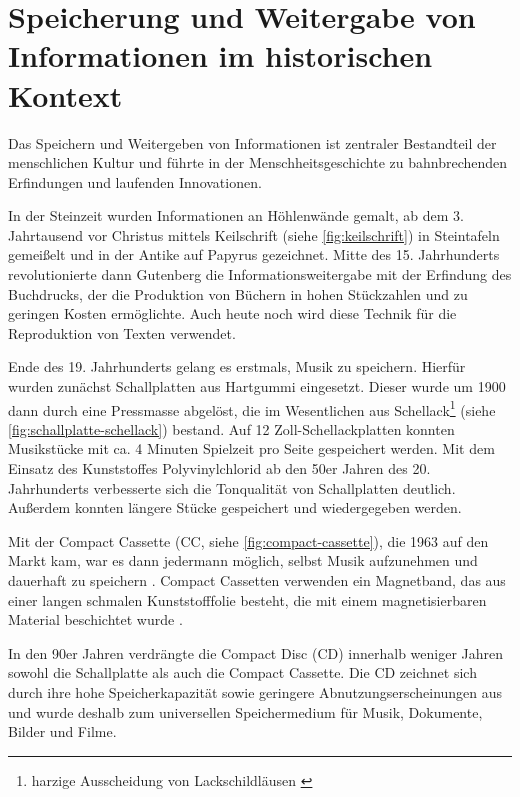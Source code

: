 \section{Speicherung und Weitergabe von Informationen im historischen Kontext}
\label{sec:einleitung}

Das Speichern und Weitergeben von Informationen ist zentraler Bestandteil der
menschlichen Kultur und führte in der Menschheitsgeschichte zu bahnbrechenden
Erfindungen und laufenden Innovationen.

In der Steinzeit wurden Informationen an Höhlenwände gemalt, ab dem 3.
Jahrtausend vor Christus mittels Keilschrift (siehe \autoref{fig:keilschrift})
in Steintafeln gemeißelt und in der Antike auf Papyrus gezeichnet. Mitte des 15.
Jahrhunderts revolutionierte dann Gutenberg die Informationsweitergabe mit der
Erfindung des Buchdrucks, der die Produktion von Büchern in hohen Stückzahlen
und zu geringen Kosten ermöglichte. Auch heute noch wird diese Technik für die
Reproduktion von Texten verwendet.

Ende des 19. Jahrhunderts gelang es erstmals, Musik zu speichern. Hierfür wurden
zunächst Schallplatten aus Hartgummi eingesetzt. Dieser wurde um 1900 dann durch
eine Pressmasse abgelöst, die im Wesentlichen aus Schellack\footnote{harzige
Ausscheidung von Lackschildläusen \cite{schellack}} (siehe
\autoref{fig:schallplatte-schellack}) bestand. Auf 12 Zoll-Schellackplatten
konnten Musikstücke mit ca. 4 Minuten Spielzeit pro Seite gespeichert werden.
Mit dem Einsatz des Kunststoffes Polyvinylchlorid ab den 50er Jahren des 20.
Jahrhunderts verbesserte sich die Tonqualität von Schallplatten deutlich.
Außerdem konnten längere Stücke gespeichert und wiedergegeben werden.
\cite{schallplatte1}

Mit der Compact Cassette (CC, siehe \autoref{fig:compact-cassette}), die 1963
auf den Markt kam, war es dann jedermann möglich, selbst Musik aufzunehmen und
dauerhaft zu speichern \cite{kassette1}. Compact Cassetten verwenden ein
Magnetband, das aus einer langen schmalen Kunststofffolie besteht, die mit einem
magnetisierbaren Material beschichtet wurde \cite{kassette2}.

In den 90er Jahren verdrängte  die Compact Disc (CD) innerhalb weniger Jahren
sowohl die Schallplatte als auch die Compact Cassette. Die CD zeichnet sich
durch ihre hohe Speicherkapazität sowie geringere Abnutzungserscheinungen aus
und wurde deshalb zum universellen Speichermedium für Musik, Dokumente, Bilder
und Filme. \cite{cd_durchbruch}

